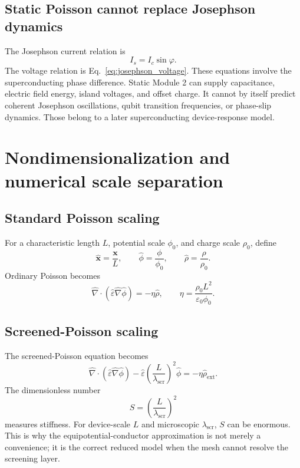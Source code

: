 \documentclass[11pt]{article}
\newcommand{\lams}{\lambda_{\mathrm{scr}}}
\begin{document}
\subsection{Static Poisson cannot replace Josephson dynamics}

The Josephson current relation is
\begin{equation}
I_s=I_c\sin\varphi.
\end{equation}
The voltage relation is Eq.~\eqref{eq:josephson_voltage}. These equations involve the superconducting phase difference. Static Module 2 can supply capacitance, electric field energy, island voltages, and offset charge. It cannot by itself predict coherent Josephson oscillations, qubit transition frequencies, or phase-slip dynamics. Those belong to a later superconducting device-response model.

\section{Nondimensionalization and numerical scale separation}

\subsection{Standard Poisson scaling}

For a characteristic length $L$, potential scale $\phi_0$, and charge scale $\rho_0$, define
\begin{equation}
\hat{\mathbf{x}}=\frac{\mathbf{x}}{L},
\qquad
\hat{\phi}=\frac{\phi}{\phi_0},
\qquad
\hat{\rho}=\frac{\rho}{\rho_0}.
\end{equation}
Ordinary Poisson becomes
\begin{equation}
\hat{\nabla}\cdot(\hat{\varepsilon}\hat{\nabla}\hat{\phi})
= -\eta\hat{\rho},
\qquad
\eta=\frac{\rho_0 L^2}{\varepsilon_0\phi_0}.
\end{equation}

\subsection{Screened-Poisson scaling}

The screened-Poisson equation becomes
\begin{equation}
\hat{\nabla}\cdot(\hat{\varepsilon}\hat{\nabla}\hat{\phi})
-\hat{\varepsilon}\left(\frac{L}{\lams}\right)^2\hat{\phi}
= -\eta\hat{\rho}_{\mathrm{ext}}.
\label{eq:dimensionless_screened_poisson}
\end{equation}
The dimensionless number
\begin{equation}
S=\left(\frac{L}{\lams}\right)^2
\end{equation}
measures stiffness. For device-scale $L$ and microscopic $\lams$, $S$ can be enormous. This is why the equipotential-conductor approximation is not merely a convenience; it is the correct reduced model when the mesh cannot resolve the screening layer.
\end{document}
